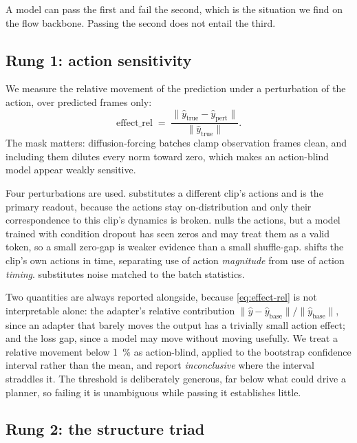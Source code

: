 A model can pass the first and fail the second, which is the situation we
find on the flow backbone. Passing the second does not entail the third.

\subsection{Rung 1: action sensitivity}

We measure the relative movement of the prediction under a perturbation of
the action, over predicted frames only:
\begin{equation}
  \label{eq:effect-rel}
  \mathrm{effect\_rel} \;=\; \frac{\lVert \hat{y}_{\text{true}} - \hat{y}_{\text{pert}} \rVert}{\lVert \hat{y}_{\text{true}} \rVert}.
\end{equation}
The mask matters: diffusion-forcing batches clamp observation frames clean,
and including them dilutes every norm toward zero, which makes an
action-blind model appear weakly sensitive.

Four perturbations are used.  substitutes a different clip's
actions and is the primary readout, because the actions stay on-distribution
and only their correspondence to this clip's dynamics is broken.
 nulls the actions, but a model trained with condition dropout has
seen zeros and may treat them as a valid token, so a small zero-gap is
weaker evidence than a small shuffle-gap.  shifts the clip's own
actions in time, separating use of action \emph{magnitude} from use of
action \emph{timing}.  substitutes noise matched to the batch
statistics.

Two quantities are always reported alongside, because
\cref{eq:effect-rel} is not interpretable alone: the adapter's relative
contribution $\lVert \hat{y} - \hat{y}_{\text{base}} \rVert / \lVert
\hat{y}_{\text{base}} \rVert$, since an adapter that barely moves the output
has a trivially small action effect; and the loss gap, since a model may
move without moving usefully. We treat a relative movement below
\SI{1}{\percent} as action-blind, applied to the bootstrap confidence
interval rather than the mean, and report \emph{inconclusive} where the
interval straddles it. The threshold is deliberately generous, far below
what could drive a planner, so failing it is unambiguous while passing it
establishes little.

\subsection{Rung 2: the structure triad}

